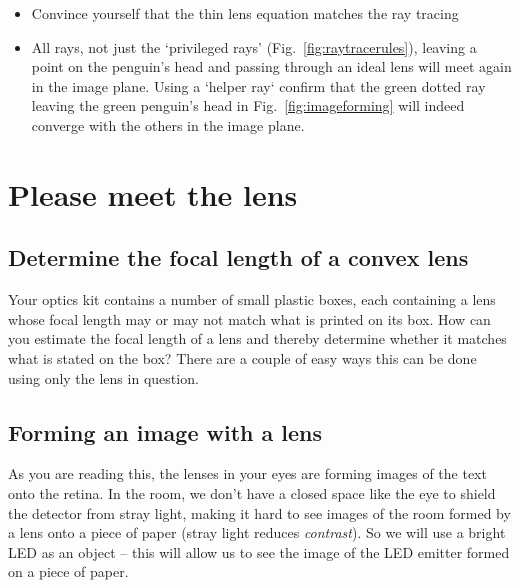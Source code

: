 \documentclass[a4paper]{report}
\begin{document}
	\begin{itemize}
	    \item Convince yourself that the thin lens equation matches the ray tracing
	    \item All rays, not just the `privileged rays' (Fig.~\ref{fig:raytracerules}), leaving a point on the penguin's head and passing through an ideal lens will meet again in the image plane. Using a `helper ray` confirm that the green dotted ray leaving the green penguin's head in Fig.~\ref{fig:imageforming} will indeed converge with the others in the image plane.
	\end{itemize}


    \clearpage

	\section{Please meet the lens}

    \subsection{Determine the focal length of a convex lens}
	\hypertarget{hintBack-focal_length}{}
	Your optics kit contains a number of small plastic boxes, each containing a lens whose focal length may or may not match what is printed on its box.
	How can you estimate the focal length of a lens and thereby determine whether it matches what is stated on the box?
    There are a couple of easy ways this can be done using only the lens in question.



    \subsection{Forming an image with a lens}
	\hypertarget{hintBack-image}{}
	As you are reading this, the lenses in your eyes are forming images of the text onto the retina.
	In the room, we don't have a closed space like the eye to shield the detector from stray light, making it hard to see images of the room formed by a lens onto a piece of paper (stray light reduces \emph{contrast}).
	So we will use a bright LED as an object -- this will allow us to see the image of the LED emitter formed on a piece of paper.
\end{document}

